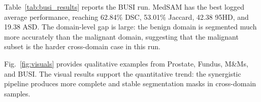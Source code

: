 \begin{table}[!htbp]
\centering
\caption{Logged SynFoC results on the M\&Ms dataset. Vendor columns report LV / MYO / RV DSC.}
\label{tab:mnms_results}
\end{table}

Table~\ref{tab:busi_results} reports the BUSI run. MedSAM has the best logged average performance, reaching 62.84\% DSC, 53.01\% Jaccard, 42.38 95HD, and 19.38 ASD. The domain-level gap is large: the benign domain is segmented much more accurately than the malignant domain, suggesting that the malignant subset is the harder cross-domain case in this run.

\begin{table}[!htbp]
\centering
\caption{Logged SynFoC results on the BUSI dataset.}
\label{tab:busi_results}
\end{table}

Fig.~\ref{fig:visuals} provides qualitative examples from Prostate, Fundus, M\&Ms, and BUSI. The visual results support the quantitative trend: the synergistic pipeline produces more complete and stable segmentation masks in cross-domain samples.

